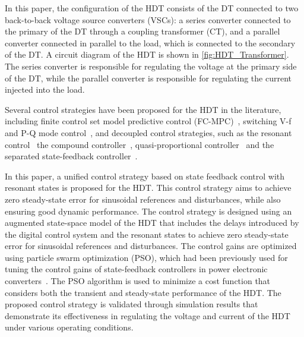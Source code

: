 In this paper, the configuration of the HDT consists of the DT connected to two back-to-back voltage source converters (VSCs): a series converter connected to the primary of the DT through a coupling transformer (CT), and a parallel converter connected in parallel to the load, which is connected to the secondary of the DT. A circuit diagram of the HDT is shown in \cref{fig:HDT_Transformer}. The series converter is responsible for regulating the voltage at the primary side of the DT, while the parallel converter is responsible for regulating the current injected into the load.

Several control strategies have been proposed for the HDT in the literature, including finite control set model predictive control (FC-MPC)~\cite{costaFourlegMatrixConverter2022}, switching V-f and P-Q mode control~\cite{xuThreePhaseHybridTransformer2023}, and decoupled control strategies, such as the resonant control~\cite{matelskiBadaniaEksperymentalneTransformatora2023} the compound controller~\cite{liuCompoundControlSystem2020}, quasi-proportional controller~\cite{liuQuasiProportionalResonantControlHybrid2022} and the separated state-feedback controller~\cite{carrenoStateFeedbackControlHybrid2024}.

In this paper, a unified control strategy based on state feedback control with resonant states is proposed for the HDT. This control strategy aims to achieve zero steady-state error for sinusoidal references and disturbances, while also ensuring good dynamic performance. The control strategy is designed using an augmented state-space model of the HDT that includes the delays introduced by the digital control system and the resonant states to achieve zero steady-state error for sinusoidal references and disturbances. The control gains are optimized using particle swarm optimization (PSO), which had been previously used for tuning the control gains of state-feedback controllers in power electronic converters~\cite{ufnalskiParticleSwarmOptimization2015}. The PSO algorithm is used  to minimize a cost function that considers both the transient and steady-state performance of the HDT. The proposed control strategy is validated through simulation results that demonstrate its effectiveness in regulating the voltage and current of the HDT under various operating conditions.